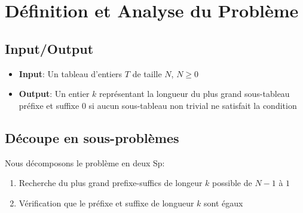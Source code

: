 %

\section{Définition et Analyse du Problème}\label{analyse}


\subsection{Input/Output}

\begin{itemize}
\item \textbf{Input}:
    Un tableau d'entiers $T$ de taille $N$,
    $N \geq 0$

\item \textbf{Output}:
    Un entier $k$ représentant la longueur du plus grand sous-tableau préfixe et suffixe
    $0$ si aucun sous-tableau non trivial ne satisfait la condition

\end{itemize}


\subsection{Découpe en sous-problèmes}

Nous décomposons le problème en deux Sp:
\begin{enumerate}
\item Recherche du plus grand prefixe-suffics de longeur $k$ possible de $N-1$ à $1$
\item Vérification que le préfixe et suffixe de longueur $k$ sont égaux
\end{enumerate}
